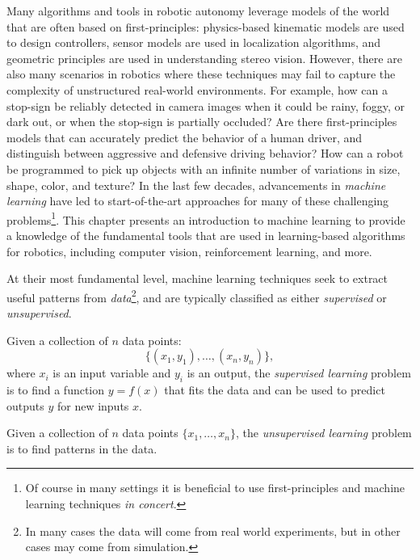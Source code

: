 Many algorithms and tools in robotic autonomy leverage models of the world that are often based on first-principles: physics-based kinematic models are used to design controllers, sensor models are used in localization algorithms, and geometric principles are used in understanding stereo vision. However, there are also many scenarios in robotics where these techniques may fail to capture the complexity of unstructured real-world environments. For example, how can a stop-sign be reliably detected in camera images when it could be rainy, foggy, or dark out, or when the stop-sign is partially occluded? Are there first-principles models that can accurately predict the behavior of a human driver, and distinguish between aggressive and defensive driving behavior? How can a robot be programmed to pick up objects with an infinite number of variations in size, shape, color, and texture? In the last few decades, advancements in \textit{machine learning}\cite{HastieTibshiraniEtAl2017} have led to start-of-the-art approaches for many of these challenging problems\footnote{Of course in many settings it is beneficial to use first-principles and machine learning techniques \textit{in concert}.}. This chapter presents an introduction to machine learning to provide a knowledge of the fundamental tools that are used in learning-based algorithms for robotics, including computer vision, reinforcement learning, and more.

At their most fundamental level, machine learning techniques seek to extract useful patterns from \textit{data}\footnote{In many cases the data will come from real world experiments, but in other cases may come from simulation.}, and are typically classified as either \textit{supervised} or \textit{unsupervised}.

\begin{definition}
Given a collection of $n$ data points:
\begin{equation*}
\{(x_1, y_1), \dots, (x_n, y_n)\},    
\end{equation*}
where $x_i$ is an input variable and $y_i$ is an output, the \textit{supervised learning} problem is to find a function $y = f(x)$ that fits the data and can be used to predict outputs $y$ for new inputs $x$. 
\end{definition}

\begin{definition}
Given a collection of $n$ data points $\{x_1, \dots, x_n\}$, the \textit{unsupervised learning} problem is to find patterns in the data.
\end{definition}


